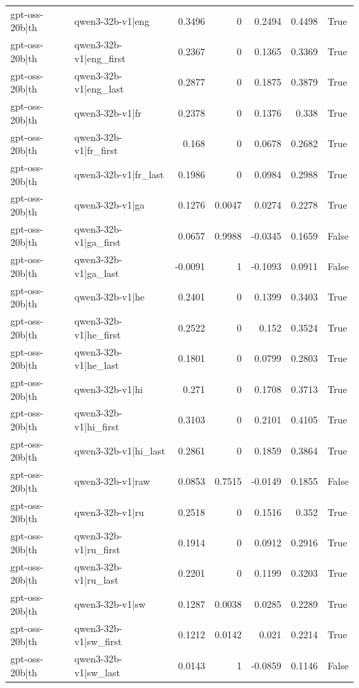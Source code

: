\begin{table}
\begin{tabular}{l l r r r r l}
gpt-oss-20b|th & qwen3-32b-v1|eng & 0.3496 & 0 & 0.2494 & 0.4498 & True \\
gpt-oss-20b|th & qwen3-32b-v1|eng_first & 0.2367 & 0 & 0.1365 & 0.3369 & True \\
gpt-oss-20b|th & qwen3-32b-v1|eng_last & 0.2877 & 0 & 0.1875 & 0.3879 & True \\
gpt-oss-20b|th & qwen3-32b-v1|fr & 0.2378 & 0 & 0.1376 & 0.338 & True \\
gpt-oss-20b|th & qwen3-32b-v1|fr_first & 0.168 & 0 & 0.0678 & 0.2682 & True \\
gpt-oss-20b|th & qwen3-32b-v1|fr_last & 0.1986 & 0 & 0.0984 & 0.2988 & True \\
gpt-oss-20b|th & qwen3-32b-v1|ga & 0.1276 & 0.0047 & 0.0274 & 0.2278 & True \\
gpt-oss-20b|th & qwen3-32b-v1|ga_first & 0.0657 & 0.9988 & -0.0345 & 0.1659 & False \\
gpt-oss-20b|th & qwen3-32b-v1|ga_last & -0.0091 & 1 & -0.1093 & 0.0911 & False \\
gpt-oss-20b|th & qwen3-32b-v1|he & 0.2401 & 0 & 0.1399 & 0.3403 & True \\
gpt-oss-20b|th & qwen3-32b-v1|he_first & 0.2522 & 0 & 0.152 & 0.3524 & True \\
gpt-oss-20b|th & qwen3-32b-v1|he_last & 0.1801 & 0 & 0.0799 & 0.2803 & True \\
gpt-oss-20b|th & qwen3-32b-v1|hi & 0.271 & 0 & 0.1708 & 0.3713 & True \\
gpt-oss-20b|th & qwen3-32b-v1|hi_first & 0.3103 & 0 & 0.2101 & 0.4105 & True \\
gpt-oss-20b|th & qwen3-32b-v1|hi_last & 0.2861 & 0 & 0.1859 & 0.3864 & True \\
gpt-oss-20b|th & qwen3-32b-v1|raw & 0.0853 & 0.7515 & -0.0149 & 0.1855 & False \\
gpt-oss-20b|th & qwen3-32b-v1|ru & 0.2518 & 0 & 0.1516 & 0.352 & True \\
gpt-oss-20b|th & qwen3-32b-v1|ru_first & 0.1914 & 0 & 0.0912 & 0.2916 & True \\
gpt-oss-20b|th & qwen3-32b-v1|ru_last & 0.2201 & 0 & 0.1199 & 0.3203 & True \\
gpt-oss-20b|th & qwen3-32b-v1|sw & 0.1287 & 0.0038 & 0.0285 & 0.2289 & True \\
gpt-oss-20b|th & qwen3-32b-v1|sw_first & 0.1212 & 0.0142 & 0.021 & 0.2214 & True \\
gpt-oss-20b|th & qwen3-32b-v1|sw_last & 0.0143 & 1 & -0.0859 & 0.1146 & False \\

\end{tabular}
\end{table}
